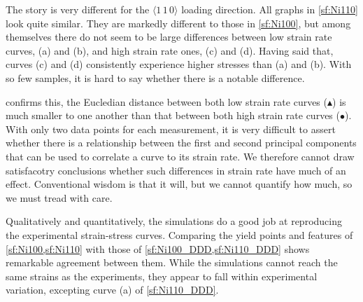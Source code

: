 The story is very different for the $\langle 1\, 1\, 0 \rangle$ loading direction. All graphs in \cref{sf:Ni110} look quite similar. They are markedly different to those in \cref{sf:Ni100}, but among themselves there do not seem to be large differences between low strain rate curves, (a) and (b), and high strain rate ones, (c) and (d). Having said that, curves (c) and (d) consistently experience higher stresses than (a) and (b). With so few samples, it is hard to say whether there is a notable difference.

 confirms this, the Eucledian distance between both low strain rate curves (\textcolor{matlabBlue}{$\blacktriangle$}) is much smaller to one another than that between both high strain rate curves (\textcolor{matlabOrange}{$\bullet$}). With only two data points for each measurement, it is very difficult to assert whether there is a relationship between the first and second principal components that can be used to correlate a curve to its strain rate. We therefore cannot draw satisfacotry conclusions whether such differences in strain rate have much of an effect. Conventional wisdom is that it will, but we cannot quantify how much, so we must tread with care.

Qualitatively and quantitatively, the simulations do a good job at reproducing the experimental strain-stress curves. Comparing the yield points and features of \cref{sf:Ni100,sf:Ni110} with those of \cref{sf:Ni100_DDD,sf:Ni110_DDD} shows remarkable agreement between them. While the simulations cannot reach the same strains as the experiments, they appear to fall within experimental variation, excepting curve (a) of \cref{sf:Ni110_DDD}.

